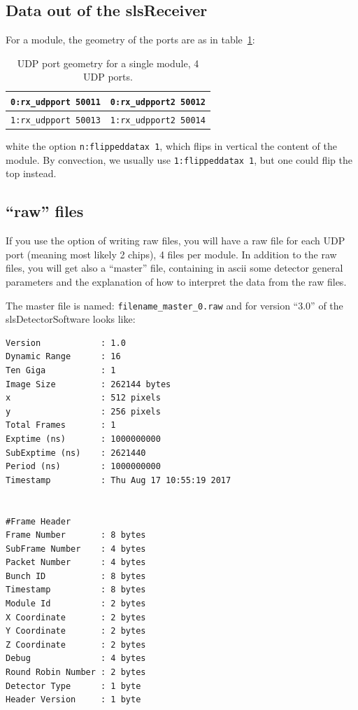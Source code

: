 \documentclass{article}
\begin{document}
\subsection{Data out of the slsReceiver}


For a module, the geometry of the ports are as in table~\ref{tports}: 
\begin{table}
\begin{tabular}{|c|c|}
\hline
{\tt{0:rx\_udpport 50011}} &  {\tt{0:rx\_udpport2 50012}}\\  
\hline
{\tt{1:rx\_udpport 50013}} &  {\tt{1:rx\_udpport2 50014}}\\  
\hline
\end{tabular}
\caption{UDP port geometry for a single module, 4 UDP ports.}
\label{tports}
\end{table}
white the option {\tt{n:flippeddatax 1}}, which flips in vertical the content of the module. By convection, we usually use {\tt{1:flippeddatax 1}}, but one could flip the top instead.


\subsection{``raw'' files}
If you use the option of writing raw files, you will have a raw file for each UDP port (meaning most likely 2 chips), 4 files per module. In addition to the raw files, you will get also a ``master'' file, containing in ascii some detector general parameters and the explanation of how to interpret the data from the raw files.
   
The master file is named: {\tt{filename\_master\_0.raw}} and for version ``3.0'' of the slsDetectorSoftware looks like:
 
\begin{verbatim}
Version            : 1.0
Dynamic Range      : 16
Ten Giga           : 1
Image Size         : 262144 bytes
x                  : 512 pixels
y                  : 256 pixels
Total Frames       : 1
Exptime (ns)       : 1000000000
SubExptime (ns)    : 2621440
Period (ns)        : 1000000000
Timestamp          : Thu Aug 17 10:55:19 2017


#Frame Header
Frame Number       : 8 bytes
SubFrame Number    : 4 bytes
Packet Number      : 4 bytes
Bunch ID           : 8 bytes
Timestamp          : 8 bytes
Module Id          : 2 bytes
X Coordinate       : 2 bytes
Y Coordinate       : 2 bytes
Z Coordinate       : 2 bytes
Debug              : 4 bytes
Round Robin Number : 2 bytes
Detector Type      : 1 byte
Header Version     : 1 byte
\end{verbatim}
\end{document}
